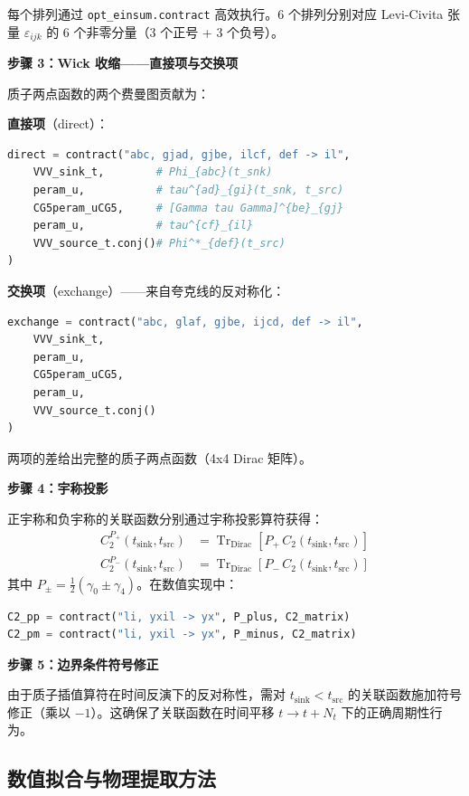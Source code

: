 \documentclass[11pt,a4paper]{ctexart}
\begin{document}
每个排列通过 \texttt{opt\_einsum.contract} 高效执行。6 个排列分别对应 Levi-Civita 张量 $\varepsilon_{ijk}$ 的 6 个非零分量（3 个正号 + 3 个负号）。

\textbf{步骤 3：Wick 收缩——直接项与交换项}

质子两点函数的两个费曼图贡献为：

\textbf{直接项}（direct）：
\begin{lstlisting}[language=Python]
direct = contract("abc, gjad, gjbe, ilcf, def -> il",
    VVV_sink_t,        # Phi_{abc}(t_snk)
    peram_u,           # tau^{ad}_{gi}(t_snk, t_src)
    CG5peram_uCG5,     # [Gamma tau Gamma]^{be}_{gj}
    peram_u,           # tau^{cf}_{il}
    VVV_source_t.conj()# Phi^*_{def}(t_src)
)
\end{lstlisting}

\textbf{交换项}（exchange）——来自夸克线的反对称化：
\begin{lstlisting}[language=Python]
exchange = contract("abc, glaf, gjbe, ijcd, def -> il",
    VVV_sink_t,
    peram_u,
    CG5peram_uCG5,
    peram_u,
    VVV_source_t.conj()
)
\end{lstlisting}

两项的差给出完整的质子两点函数（4x4 Dirac 矩阵）。

\textbf{步骤 4：宇称投影}

正宇称和负宇称的关联函数分别通过宇称投影算符获得：
\begin{align}
C_2^{P_+}(t_{\text{sink}}, t_{\text{src}}) &= \operatorname{Tr}_{\text{Dirac}}\!\left[ P_+ \, C_2(t_{\text{sink}}, t_{\text{src}}) \right] \\
C_2^{P_-}(t_{\text{sink}}, t_{\text{src}}) &= \operatorname{Tr}_{\text{Dirac}}\!\left[ P_- \, C_2(t_{\text{sink}}, t_{\text{src}}) \right]
\end{align}
其中 $P_{\pm} = \frac{1}{2}(\gamma_0 \pm \gamma_4)$。在数值实现中：
\begin{lstlisting}[language=Python]
C2_pp = contract("li, yxil -> yx", P_plus, C2_matrix)
C2_pm = contract("li, yxil -> yx", P_minus, C2_matrix)
\end{lstlisting}

\textbf{步骤 5：边界条件符号修正}

由于质子插值算符在时间反演下的反对称性，需对 $t_{\text{sink}} < t_{\text{src}}$ 的关联函数施加符号修正（乘以 $-1$）。这确保了关联函数在时间平移 $t \to t + N_t$ 下的正确周期性行为。

\subsection{数值拟合与物理提取方法}
\end{document}
